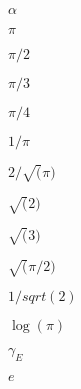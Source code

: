\documentclass{article}
\begin{document}
$ \alpha $
\pagebreak

$ \pi $
\pagebreak

$ \pi / 2 $
\pagebreak

$ \pi / 3 $
\pagebreak

$ \pi / 4 $
\pagebreak

$ 1 / \pi $
\pagebreak

$ 2 / \sqrt(\pi) $
\pagebreak

$ \sqrt(2) $
\pagebreak

$ \sqrt(3) $
\pagebreak

$ \sqrt(\pi/2) $
\pagebreak

$ 1 / sqrt(2) $
\pagebreak

$ \log(\pi) $
\pagebreak

$ \gamma_E $
\pagebreak

$ e $
\pagebreak
\end{document}
